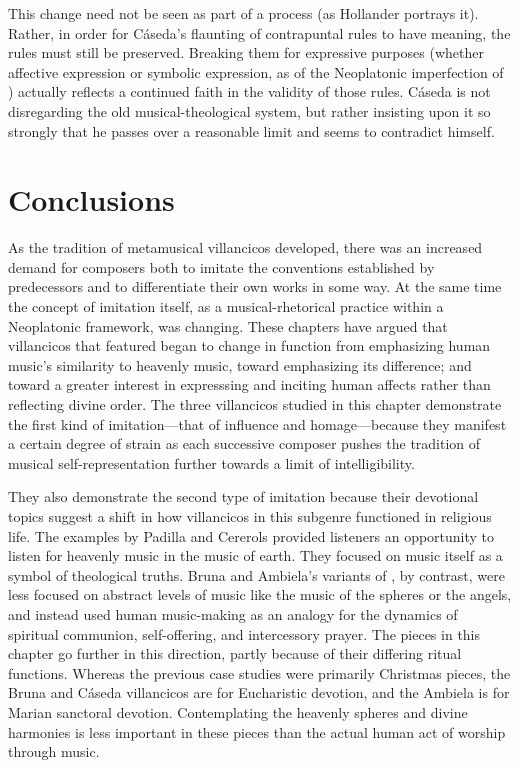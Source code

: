 This change need not be seen as part of a  process (as
Hollander portrays it).
Rather, in order for Cáseda's flaunting of contrapuntal rules to have meaning,
the rules must still be preserved.
Breaking them for expressive purposes (whether affective expression or symbolic
expression, as of the Neoplatonic imperfection of ) actually reflects a continued faith in the validity of those
rules.
Cáseda is not disregarding the old musical-theological system, but rather
insisting upon it so strongly that he passes over a reasonable limit and seems
to contradict himself.

\section{Conclusions}

As the tradition of metamusical villancicos developed, there was an increased
demand for composers both to imitate the conventions established by
predecessors and to differentiate their own works in some way. 
At the same time the concept of imitation itself, as a musical-rhetorical
practice within a Neoplatonic framework, was changing.
These chapters have argued that villancicos that featured  began to change in function from emphasizing human music's
similarity to heavenly music, toward emphasizing its difference; and toward a
greater interest in expresssing and inciting human affects rather than
reflecting divine order.
The three villancicos studied in this chapter demonstrate the first kind of
imitation---that of influence and homage---because they manifest a certain
degree of strain as each successive composer pushes the tradition of musical
self-representation further towards a limit of intelligibility.

They also demonstrate the second type of imitation because their devotional
topics suggest a shift in how villancicos in this subgenre functioned in
religious life.
The examples by Padilla and Cererols provided listeners an opportunity to
listen for heavenly music in the music of earth. 
They focused on music itself as a symbol of theological truths.
Bruna and Ambiela's variants of , by contrast,
were less focused on abstract levels of music like the music of the spheres or
the angels, and instead used human music-making as an analogy for the dynamics
of spiritual communion, self-offering, and intercessory prayer.
The pieces in this chapter go further in this direction, partly because of
their differing ritual functions.
Whereas the previous case studies were primarily Christmas pieces, the Bruna
and Cáseda villancicos are for Eucharistic devotion, and the Ambiela is for
Marian sanctoral devotion.
Contemplating the heavenly spheres and divine harmonies is less important in
these pieces than the actual human act of worship through music.

